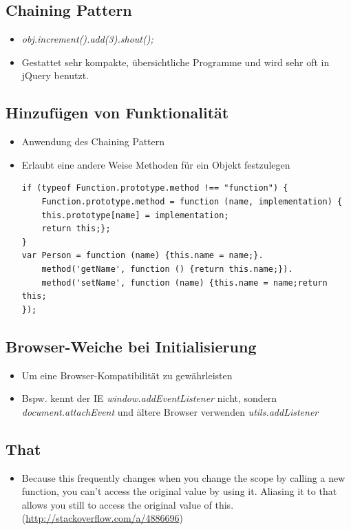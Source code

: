 \documentclass{article} %
\begin{document}
		\subsection{Chaining Pattern}
		\begin{itemize}
			\item \textit{obj.increment().add(3).shout();}
			\item Gestattet sehr kompakte, übersichtliche Programme und wird sehr oft in jQuery benutzt.
		\end{itemize}
		\subsection{Hinzufügen von Funktionalität}
		\begin{itemize}
			\item Anwendung des Chaining Pattern
			\item Erlaubt eine andere Weise Methoden für ein Objekt festzulegen 
			\begin{lstlisting}
if (typeof Function.prototype.method !== "function") {
	Function.prototype.method = function (name, implementation) {
	this.prototype[name] = implementation;
	return this;};
}
var Person = function (name) {this.name = name;}.
	method('getName', function () {return this.name;}).
	method('setName', function (name) {this.name = name;return this;
});
			\end{lstlisting}
		\end{itemize}
		\subsection{Browser-Weiche bei Initialisierung}
		\begin{itemize}
			\item Um eine Browser-Kompatibilität zu gewährleisten
			\item Bspw. kennt der IE \textit{window.addEventListener} nicht, sondern \textit{document.attachEvent} und ältere Browser verwenden \textit{utils.addListener}
		\end{itemize}
		\subsection{That}
		\begin{itemize}
			\item Because this frequently changes when you change the scope by calling a new function, you can't access the original value by using it. Aliasing it to that allows you still to access the original value of this. (\url{http://stackoverflow.com/a/4886696})
		\end{itemize}
	
\end{document}
